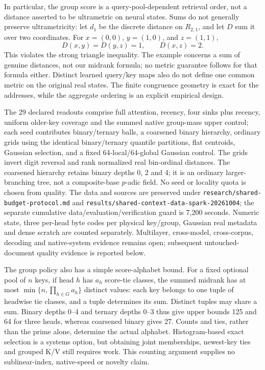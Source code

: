 \documentclass[11pt]{article}
\begin{document}
In particular, the group score is a query-pool-dependent retrieval order,
not a distance asserted to be ultrametric on neural states. Sums do not
generally preserve ultrametricity: let \(d_1\) be the discrete distance on
\(R_{2,1}\), and let \(D\) sum it over two coordinates. For
\(x=(0,0)\), \(y=(1,0)\), and \(z=(1,1)\),
\[
 D(x,y)=D(y,z)=1,\qquad D(x,z)=2.
\]
This violates the strong triangle inequality. The example concerns a sum
of genuine distances, not our midrank formula; no metric guarantee follows
for that formula either. Distinct learned query/key maps also do not define
one common metric on the original real states. The finite congruence geometry
is exact for the addresses, while the aggregate ordering is an explicit
empirical design.

The 29 declared readouts comprise full attention, recency, four sinks plus
recency, uniform older-key coverage and the summed native group-mass upper
control; each seed contributes binary/ternary balls, a coarsened binary
hierarchy, ordinary grids using the identical binary/ternary quantile
partitions, flat centroids, Gaussian selection, and a fixed 64-local/64-global
Gaussian control. The grids invert digit reversal and rank normalized real
bin-ordinal distances. The coarsened hierarchy retains binary depths 0, 2
and 4; it is an ordinary larger-branching tree, not a composite-base
\(p\)-adic field. No seed or locality quota is chosen from quality.
The data and sources are preserved under
\texttt{research/\allowbreak{}shared-\allowbreak{}budget-\allowbreak{}protocol.\allowbreak{}md} and
\texttt{results/\allowbreak{}shared-\allowbreak{}context-\allowbreak{}data-\allowbreak{}spark-\allowbreak{}20261004}; the separate cumulative
data/evaluation/verification guard is 7,200 seconds. Numeric state, three
per-head byte codes per physical key/group, Gaussian real metadata and dense
scratch are counted separately. Multilayer, cross-model, cross-corpus,
decoding and native-system evidence remains open; subsequent untouched-document
quality evidence is reported below.

The group policy also has a simple score-alphabet bound. For a fixed optional
pool of \(n\) keys, if head \(h\) has \(a_h\) score-tie classes, the summed
midrank has at most \(\min\{n,\prod_{h\in G}a_h\}\) distinct values: each key
belongs to one tuple of headwise tie classes, and a tuple determines its sum.
Distinct tuples may share a sum. Binary depths 0--4 and ternary depths 0--3
thus give upper bounds 125 and 64 for three heads, whereas coarsened binary
gives 27. Counts and ties, rather than the prime alone, determine the actual
alphabet. Histogram-based exact selection is a systems option, but obtaining
joint memberships, newest-key ties and grouped K/V still requires work. This
counting argument supplies no sublinear-index, native-speed or novelty claim.
\end{document}

